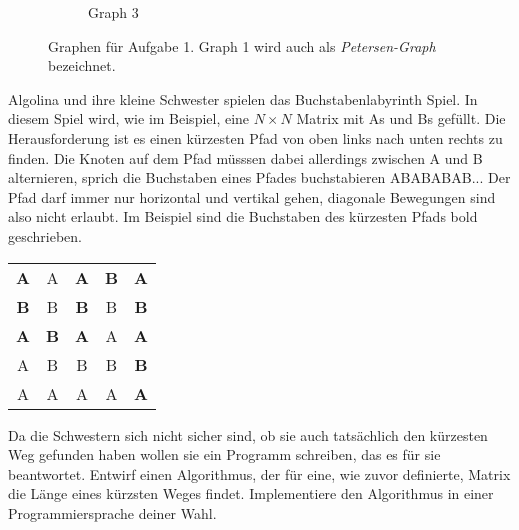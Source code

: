 \documentclass{uebung_cs}
\begin{document}
\begin{aufgabe}
\begin{center}
\begin{figure}[h]
\begin{subfigure}[b]{0.33\textwidth}
{
			}
			\hspace*{\fill}
			\caption*{Graph 3}
		\end{subfigure}
		\caption{Graphen für Aufgabe 1. Graph 1 wird auch als \textit{Petersen-Graph} bezeichnet.}
		\label{ex1graph}
	\end{figure}
\end{center}


\begin{aufgabe}[Buchstabenlabyrinth]
	Algolina und ihre kleine Schwester spielen das Buchstabenlabyrinth Spiel.
	In diesem Spiel wird, wie im Beispiel, eine $N\times N$ Matrix mit As und Bs gefüllt.
	Die Herausforderung ist es einen kürzesten Pfad von oben links nach unten rechts zu finden.
	Die Knoten auf dem Pfad müsssen dabei allerdings zwischen A und B alternieren, sprich die Buchstaben eines Pfades buchstabieren ABABABAB...
	Der Pfad darf immer nur horizontal und vertikal gehen, diagonale Bewegungen sind also nicht erlaubt.
	Im Beispiel sind die Buchstaben des kürzesten Pfads bold geschrieben.
	\begin{center}
		\begin{tabular}{ccccc}
			\textbf{A} & A & \textbf{A} & \textbf{B} & \textbf{A}\\
			\textbf{B} & B & \textbf{B} & B & \textbf{B}\\
			\textbf{A} & \textbf{B} & \textbf{A} & A & \textbf{A}\\
			A & B & B & B & \textbf{B}\\
			A & A & A & A & \textbf{A}
		\end{tabular}
	\end{center}
	Da die Schwestern sich nicht sicher sind, ob sie auch tatsächlich den kürzesten Weg gefunden haben wollen sie ein Programm schreiben, das es für sie beantwortet.
	Entwirf einen Algorithmus, der für eine, wie zuvor definierte, Matrix die Länge eines kürzsten Weges findet.
	Implementiere den Algorithmus in einer Programmiersprache deiner Wahl.
\end{aufgabe}


\end{aufgabe}
\end{document}
